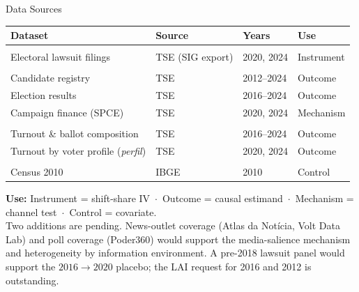 

\begin{frame}{Data Sources}
\hypertarget{src:datasources}{}

\vspace{2pt}
\centering
\scriptsize
\renewcommand{\arraystretch}{1.18}
\setlength{\tabcolsep}{6pt}
\begin{tabular}{L{5.6cm}L{2.4cm}C{1.9cm}L{2.4cm}}
  \toprule
  \textbf{Dataset} & \textbf{Source} & \textbf{Years} & \textbf{Use} \\
  \midrule

    \\
  \quad Electoral lawsuit filings & TSE (SIG export) & 2020, 2024 & Instrument \\
  \midrule

    \\
  \quad Candidate registry & TSE & 2012--2024 & Outcome \\
  \quad Election results & TSE & 2016--2024 & Outcome \\
  \quad Campaign finance (SPCE) & TSE & 2020, 2024 & Mechanism \\
  \midrule

    \\
  \quad Turnout \& ballot composition & TSE & 2016--2024 & Outcome \\
  \quad Turnout by voter profile (\emph{perfil}) & TSE & 2020, 2024 & Outcome \\
  \midrule

    \\
  \quad Census 2010 & IBGE & 2010 & Control \\

  \bottomrule
\end{tabular}

\medskip

{\raggedright\scriptsize
\textbf{Use:} Instrument = shift-share IV \,$\cdot$\, Outcome = causal estimand \,$\cdot$\, Mechanism = channel test \,$\cdot$\, Control = covariate.\\[3pt]
Two additions are pending. News-outlet coverage (Atlas da Not\'{i}cia, Volt Data Lab) and poll coverage (Poder360) would support the media-salience mechanism and heterogeneity by information environment. A pre-2018 lawsuit panel would support the $2016\to2020$ placebo; the LAI request for 2016 and 2012 is outstanding.\par}
\end{frame}
